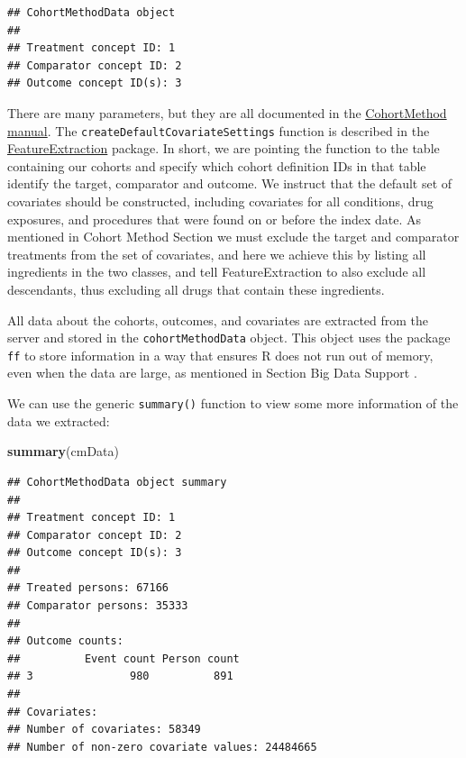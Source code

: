 \documentclass[]{book}
\newenvironment{Shaded}{\begin{snugshade}}{\end{snugshade}}
\newcommand{\KeywordTok}[1]{\textcolor[rgb]{0.13,0.29,0.53}{\textbf{#1}}}
\newcommand{\NormalTok}[1]{#1}
\begin{document}
\begin{verbatim}
## CohortMethodData object
## 
## Treatment concept ID: 1
## Comparator concept ID: 2
## Outcome concept ID(s): 3
\end{verbatim}

There are many parameters, but they are all documented in the \href{https://ohdsi.github.io/CohortMethod/reference/}{CohortMethod manual}. The \texttt{createDefaultCovariateSettings} function is described in the \href{https://ohdsi.github.io/FeatureExtraction/}{FeatureExtraction} package. In short, we are pointing the function to the table containing our cohorts and specify which cohort definition IDs in that table identify the target, comparator and outcome. We instruct that the default set of covariates should be constructed, including covariates for all conditions, drug exposures, and procedures that were found on or before the index date. As mentioned in Cohort Method Section we must exclude the target and comparator treatments from the set of covariates, and here we achieve this by listing all ingredients in the two classes, and tell FeatureExtraction to also exclude all descendants, thus excluding all drugs that contain these ingredients.

All data about the cohorts, outcomes, and covariates are extracted from the server and stored in the \texttt{cohortMethodData} object. This object uses the package \texttt{ff} to store information in a way that ensures R does not run out of memory, even when the data are large, as mentioned in Section Big Data Support .

We can use the generic \texttt{summary()} function to view some more information of the data we extracted:

\begin{Shaded}
\begin{Highlighting}[]
\KeywordTok{summary}\NormalTok{(cmData)}
\end{Highlighting}
\end{Shaded}

\begin{verbatim}
## CohortMethodData object summary
## 
## Treatment concept ID: 1
## Comparator concept ID: 2
## Outcome concept ID(s): 3
## 
## Treated persons: 67166
## Comparator persons: 35333
## 
## Outcome counts:
##          Event count Person count
## 3               980          891
## 
## Covariates:
## Number of covariates: 58349
## Number of non-zero covariate values: 24484665
\end{verbatim}
\end{document}
